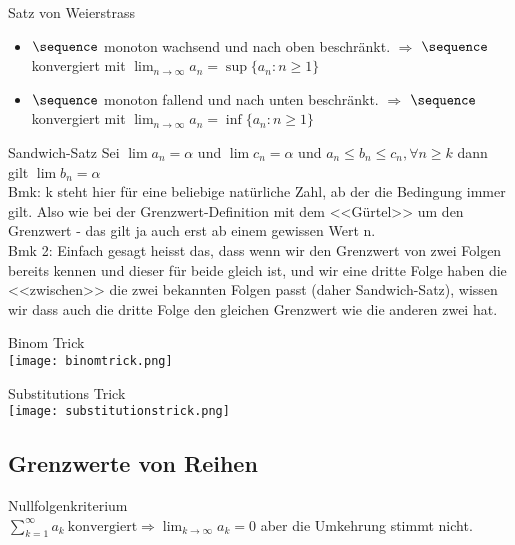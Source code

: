 \begin{concept}{Satz von Weierstrass}
    \begin{itemize}
        \item $\sequence$ monoton wachsend und nach oben beschränkt. $\Rightarrow$ $\sequence$ konvergiert mit $\lim_{n \to \infty} a_n = \sup \{a_n : n \geq 1\}$
        \item $\sequence$ monoton fallend und nach unten beschränkt. $\Rightarrow$ $\sequence$ konvergiert mit $\lim_{n \to \infty} a_n = \inf \{a_n : n \geq 1\}$
    \end{itemize}
\end{concept}

\begin{theorem}{Sandwich-Satz}
    Sei $\lim a_n = \alpha$ und $\lim c_n = \alpha$ und $a_n \leq b_n \leq c_n, \forall n \geq k$ dann gilt $\lim b_n = \alpha$\\
    Bmk: k steht hier für eine beliebige natürliche Zahl, ab der die Bedingung immer gilt. Also wie bei der Grenzwert-Definition mit dem <<Gürtel>> um den Grenzwert - das gilt ja auch erst ab einem gewissen Wert n.\\
    Bmk 2: Einfach gesagt heisst das, dass wenn wir den Grenzwert von zwei Folgen bereits kennen und dieser für beide gleich ist, und wir eine dritte Folge haben die <<zwischen>> die zwei bekannten Folgen passt (daher Sandwich-Satz), wissen wir dass auch die dritte Folge den gleichen Grenzwert wie die anderen zwei hat.
\end{theorem}    

\begin{KR}{Binom Trick}\\
    \texttt{[image: binomtrick.png]}
\end{KR}

\begin{KR}{Substitutions Trick}\\
    \texttt{[image: substitutionstrick.png]}
\end{KR}

\raggedcolumns
\columnbreak

\subsection{Grenzwerte von Reihen}


\begin{concept} {Nullfolgenkriterium}\\
    $\sum_{k=1}^\infty a_k~\text{konvergiert} \Rightarrow \lim_{k \to \infty} a_k = 0$ aber die Umkehrung stimmt nicht.
\end{concept}

